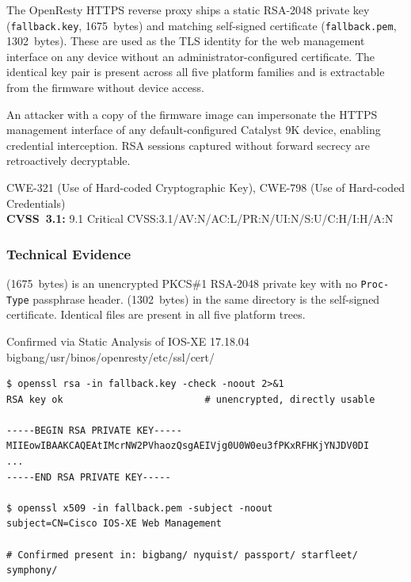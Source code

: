 \documentclass[11pt,a4paper]{article}
\begin{document}
\begin{overviewbox}
The OpenResty HTTPS reverse proxy ships a static RSA-2048 private key
(\texttt{fallback.key}, 1675~bytes) and matching self-signed certificate
(\texttt{fallback.pem}, 1302~bytes). These are used as the TLS identity for the web
management interface on any device without an administrator-configured certificate.
The identical key pair is present across all five platform families and is extractable
from the firmware without device access.

An attacker with a copy of the firmware image can impersonate the HTTPS management
interface of any default-configured Catalyst 9K device, enabling credential
interception. RSA sessions captured without forward secrecy are retroactively
decryptable.

CWE-321 (Use of Hard-coded Cryptographic Key), CWE-798 (Use of Hard-coded Credentials)\\
\textbf{CVSS~3.1:} 9.1 Critical \quad CVSS:3.1/AV:N/AC:L/PR:N/UI:N/S:U/C:H/I:H/A:N
\end{overviewbox}

\subsubsection{Technical Evidence}

 (1675~bytes) is an
unencrypted PKCS\#1 RSA-2048 private key with no \texttt{Proc-Type} passphrase header.
 (1302~bytes) in the same directory is the self-signed certificate.
Identical files are present in all five platform trees.

\begin{pocbox}{Confirmed via Static Analysis of IOS-XE 17.18.04 bigbang/usr/binos/openresty/etc/ssl/cert/}
\begin{lstlisting}
$ openssl rsa -in fallback.key -check -noout 2>&1
RSA key ok                         # unencrypted, directly usable

-----BEGIN RSA PRIVATE KEY-----
MIIEowIBAAKCAQEAtIMcrNW2PVhaozQsgAEIVjg0U0W0eu3fPKxRFHKjYNJDV0DI
...
-----END RSA PRIVATE KEY-----

$ openssl x509 -in fallback.pem -subject -noout
subject=CN=Cisco IOS-XE Web Management

# Confirmed present in: bigbang/ nyquist/ passport/ starfleet/ symphony/
\end{lstlisting}
\end{pocbox}
\end{document}
